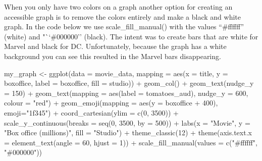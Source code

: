 \documentclass[
]{krantz}
\makeatletter
\newenvironment{Shaded}{\begin{snugshade}}{\end{snugshade}}
\newcommand{\AttributeTok}[1]{\textcolor[rgb]{0.61,0.61,0.61}{#1}}
\newcommand{\DecValTok}[1]{\textcolor[rgb]{0.06,0.06,0.06}{#1}}
\newcommand{\FunctionTok}[1]{\textcolor[rgb]{0,0,0}{#1}}
\newcommand{\NormalTok}[1]{#1}
\newcommand{\OtherTok}[1]{\textcolor[rgb]{0.37,0.37,0.37}{#1}}
\newcommand{\SpecialCharTok}[1]{\textcolor[rgb]{0,0,0}{#1}}
\newcommand{\StringTok}[1]{\textcolor[rgb]{0.5,0.5,0.5}{#1}}
\newenvironment{kframe}{%
\medskip{}
\setlength{\fboxsep}{.8em}
 \def\at@end@of@kframe{}%
 \ifinner\ifhmode%
  \def\at@end@of@kframe{\end{minipage}}%
  \begin{minipage}{\columnwidth}%
 \fi\fi%
 \def\FrameCommand##1{\hskip\@totalleftmargin \hskip-\fboxsep
 \colorbox{shadecolor}{##1}\hskip-\fboxsep
     \hskip-\linewidth \hskip-\@totalleftmargin \hskip\columnwidth}%
 \MakeFramed {\advance\hsize-\width
   \@totalleftmargin\z@ \linewidth\hsize
   \@setminipage}}%
 {\par\unskip\endMakeFramed%
 \at@end@of@kframe}
\renewenvironment{Shaded}{\begin{kframe}}{\end{kframe}}
\makeatother
\begin{document}
When you only have two colors on a graph another option for creating an accessible graph is to remove the colors entirely and make a black and white graph. In the code below we use scale\_fill\_manual() with the values ``\#ffffff'' (white) and "``\#000000'' (black). The intent was to create bars that are white for Marvel and black for DC. Unfortunately, because the graph has a white background you can see this resulted in the Marvel bars disappearing.

\begin{Shaded}
\begin{Highlighting}[]
\NormalTok{my\_graph }\OtherTok{\textless{}{-}} \FunctionTok{ggplot}\NormalTok{(}\AttributeTok{data =}\NormalTok{ movie\_data,}
           \AttributeTok{mapping =} \FunctionTok{aes}\NormalTok{(}\AttributeTok{x =}\NormalTok{ title,}
                         \AttributeTok{y =}\NormalTok{ boxoffice,}
                         \AttributeTok{label =}\NormalTok{ boxoffice, }
                         \AttributeTok{fill =}\NormalTok{ studio)) }\SpecialCharTok{+}
  \FunctionTok{geom\_col}\NormalTok{() }\SpecialCharTok{+}
  \FunctionTok{geom\_text}\NormalTok{(}\AttributeTok{nudge\_y =} \DecValTok{150}\NormalTok{)  }\SpecialCharTok{+}
  \FunctionTok{geom\_text}\NormalTok{(}\AttributeTok{mapping =} \FunctionTok{aes}\NormalTok{(}\AttributeTok{label =}\NormalTok{ tomatoes\_aud), }
            \AttributeTok{nudge\_y =} \DecValTok{600}\NormalTok{, }
            \AttributeTok{colour =} \StringTok{"red"}\NormalTok{) }\SpecialCharTok{+}
  \FunctionTok{geom\_emoji}\NormalTok{(}\AttributeTok{mapping =} \FunctionTok{aes}\NormalTok{(}\AttributeTok{y =}\NormalTok{ boxoffice }\SpecialCharTok{+} \DecValTok{400}\NormalTok{),}
             \AttributeTok{emoji=}\StringTok{"1f345"}\NormalTok{) }\SpecialCharTok{+}
  \FunctionTok{coord\_cartesian}\NormalTok{(}\AttributeTok{ylim =} \FunctionTok{c}\NormalTok{(}\DecValTok{0}\NormalTok{, }\DecValTok{3500}\NormalTok{)) }\SpecialCharTok{+}
  \FunctionTok{scale\_y\_continuous}\NormalTok{(}\AttributeTok{breaks =} \FunctionTok{seq}\NormalTok{(}\DecValTok{0}\NormalTok{, }\DecValTok{3500}\NormalTok{, }\AttributeTok{by =} \DecValTok{500}\NormalTok{)) }\SpecialCharTok{+}
  \FunctionTok{labs}\NormalTok{(}\AttributeTok{x =} \StringTok{"Movie"}\NormalTok{,}
       \AttributeTok{y =} \StringTok{"Box office (millions)"}\NormalTok{,}
       \AttributeTok{fill =} \StringTok{"Studio"}\NormalTok{) }\SpecialCharTok{+}
  \FunctionTok{theme\_classic}\NormalTok{(}\DecValTok{12}\NormalTok{) }\SpecialCharTok{+}
  \FunctionTok{theme}\NormalTok{(}\AttributeTok{axis.text.x =} \FunctionTok{element\_text}\NormalTok{(}\AttributeTok{angle =} \DecValTok{60}\NormalTok{, }
                                   \AttributeTok{hjust =} \DecValTok{1}\NormalTok{)) }\SpecialCharTok{+}
  \FunctionTok{scale\_fill\_manual}\NormalTok{(}\AttributeTok{values =} \FunctionTok{c}\NormalTok{(}\StringTok{"\#ffffff"}\NormalTok{, }\StringTok{"\#000000"}\NormalTok{))}
\end{Highlighting}
\end{Shaded}
\end{document}
